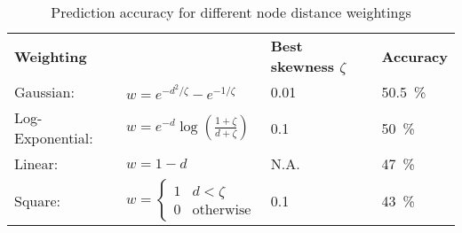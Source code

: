 \begin{table}[H]
\caption{Prediction accuracy for different node distance weightings}
\label{tab:results}
\begin{center}
\begin{tabular}{l l l l}
\multicolumn{2}{l}{
\textbf{Weighting}}														& \textbf{Best skewness $\zeta$}		& \textbf{Accuracy}\\

Gaussian:			& $w=e^{-d^2/\zeta}-e^{-1/\zeta}$							& \SI{0.01}{}						&\SI{50.5}{\percent} \\

Log-Exponential:	& $w=e^{-d} \log\left( \frac{1+\zeta}{d+\zeta}\right)$				&\SI{0.1}{}							& \SI{50}{\percent} \\ 

Linear:			& $w=1-d$											& N.A. 							&\SI{47}{\percent} \\

Square:			&$w= \begin{cases}
1				&d < \zeta \\
0				& \text{otherwise}
				\end{cases}$											& \SI{0.1}{}						& \SI{43}{\percent}
\end{tabular}
\end{center}
\label{tab:Prediction accuracy for different node distance weightings}
\end{table}